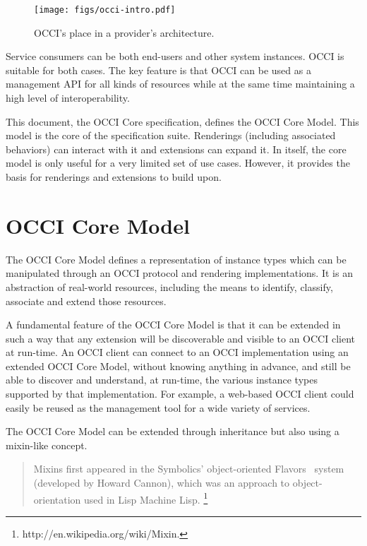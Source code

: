 \documentclass[10pt,a4paper]{article}
\begin{document}
\begin{figure}[h]
  \centering
  \texttt{[image: figs/occi-intro.pdf]}
  \caption{OCCI's place in a provider's architecture.}
  \label{fig:placement}
\end{figure}

Service consumers can be both end-users and other system
instances. OCCI is suitable for both cases. The key feature is that
OCCI can be used as a management API for all kinds of resources while
at the same time maintaining a high level of interoperability.

This document, the OCCI Core specification, defines the OCCI Core
Model. This model is the core of the specification suite. Renderings
(including associated behaviors) can interact with it and extensions
can expand it. In itself, the core model is only useful
for a very limited set of use cases. However, it provides the basis
for renderings and extensions to build upon.

\section{OCCI Core Model}
The OCCI Core Model defines a representation of instance types which
can be manipulated through an OCCI protocol and rendering implementations.
It is an abstraction of real-world resources, including the means to identify,
classify, associate and extend those resources.

A fundamental feature of the OCCI Core Model is that it can be
extended in such a way that any extension will be discoverable and
visible to an OCCI client at run-time. An OCCI client can connect to
an OCCI implementation using an extended OCCI Core Model, without
knowing anything in advance, and still be able to discover and
understand, at run-time, the various instance types
supported by that implementation.
For example, a
web-based OCCI client could easily be reused as the management tool
for a wide variety of services.

The OCCI Core Model can be extended through inheritance but also
using a mixin-like concept.

\begin{quote}
  Mixins first appeared in the Symbolics' object-oriented
  Flavors~\cite{Moon:1986:flavors} system (developed by Howard
  Cannon), which was an approach to object-orientation used in Lisp
  Machine Lisp.%
  \footnote{http://en.wikipedia.org/wiki/Mixin.}
\end{quote}
\end{document}
